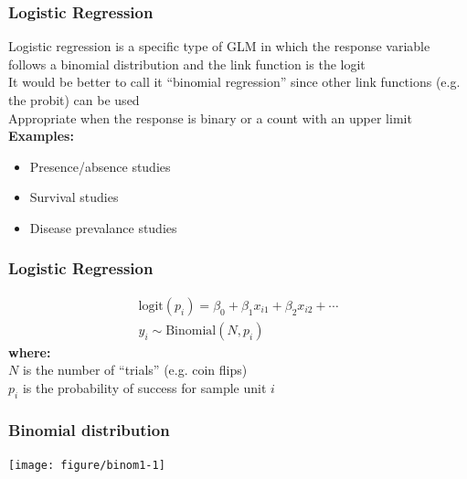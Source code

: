 \documentclass[color=usenames,dvipsnames]{beamer}\usepackage[]{graphicx}\usepackage[]{color}
\newenvironment{knitrout}{}{} %
\begin{document}
\begin{frame}
  \frametitle{Logistic Regression}
  Logistic regression is a specific type of GLM in which the
      response variable follows a binomial distribution and the link
      function is the logit \\
  \pause
  \vfill
  It would be better to call it ``binomial regression'' since other
      link functions (e.g. the probit) can be used \\
  \pause
  \vfill
  Appropriate when the response is binary or a count with an
  upper limit
  \pause
  \vfill
  {\bf Examples:}
      \begin{itemize}
        \normalsize
        \item Presence/absence studies
        \item Survival studies
        \item Disease prevalance studies
      \end{itemize}
\end{frame}







\begin{frame}
  \frametitle{Logistic Regression}
    \begin{gather*}
      \mathrm{logit}(p_i) = \beta_0 + \beta_1 x_{i1} + \beta_2 x_{i2} + \cdots \\
      y_i \sim \mathrm{Binomial}(N, p_i)
  \end{gather*}
  \pause
  {\bf where: \\}
  $N$ is the number of ``trials'' (e.g. coin flips) \\
  $p_i$ is the probability of success for sample unit $i$
\end{frame}



\begin{frame}[fragile]
  \frametitle{Binomial distribution}%
  \vspace{-0.4cm}
\begin{center}
\begin{knitrout}
\color{fgcolor}
\texttt{[image: figure/binom1-1]} 

\end{knitrout}
\end{center}
\vfill
\end{frame}
\end{document}
